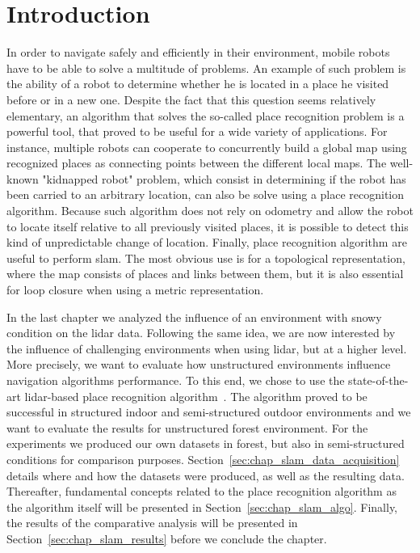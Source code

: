 \section{Introduction}
\label{sec:chap_slam_intro}

In order to navigate safely and efficiently in their environment, mobile robots have to be able to solve a multitude of problems. An example of such problem is the ability of a robot to determine whether he is located in a place he visited before or in a new one.  Despite the fact that this question seems relatively elementary, an algorithm that solves the so-called place recognition problem is a powerful tool, that proved to be useful for a wide variety of applications. For instance, multiple robots can cooperate to concurrently build a global map using recognized places as connecting points between the different local maps. The well-known "kidnapped robot" problem, which consist in determining if the robot has been carried to an arbitrary location, can also be solve using a place recognition algorithm. Because such algorithm does not rely on odometry and allow the robot to locate itself relative to all previously visited places, it is possible to detect this kind of unpredictable change of location. Finally, place recognition algorithm are useful to perform \gls*{slam}. The most obvious use is for a topological representation, where the map consists of places and links between them, but it is also essential for loop closure when using a metric representation. 

In the last chapter we analyzed the influence of an environment with snowy condition on the \gls*{lidar} data. Following the same idea, we are now interested by the influence of challenging environments when using \gls*{lidar}, but at a higher level. More precisely, we want to evaluate how unstructured environments influence navigation algorithms performance. To this end, we chose to use the state-of-the-art \gls*{lidar}-based place recognition algorithm~\citep{Steder2011b}. The algorithm proved to be successful in structured indoor and semi-structured outdoor environments and we want to evaluate the results for unstructured forest environment. For the experiments we produced our own datasets in forest, but also in semi-structured conditions for comparison purposes. Section~\ref{sec:chap_slam_data_acquisition} details where and how the datasets were produced, as well as the resulting data. Thereafter, fundamental concepts related to the place recognition algorithm as the algorithm itself will be presented in Section~\ref{sec:chap_slam_algo}. Finally, the results of the comparative analysis will be presented in Section~\ref{sec:chap_slam_results} before we conclude the chapter.


